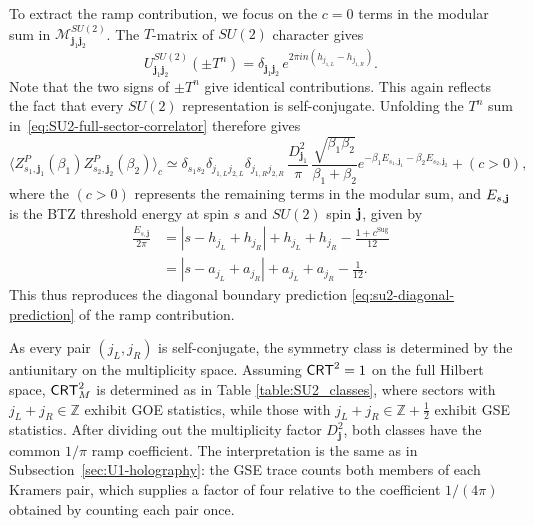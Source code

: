 \documentclass[11pt]{article}
\numberwithin{equation}{section}
\begin{document}
To extract the ramp contribution, we focus on  the  $c=0$ terms in the modular sum  in $\mathcal M^{SU(2)}_{\mathbf j_1\mathbf j_2}$. The $T$-matrix of $SU(2)$ character gives
\begin{equation}
U^{SU(2)}_{\mathbf j_1\mathbf j_2}(\pm T^n)
 =\delta_{\mathbf j_1\mathbf j_2}\,
 e^{2\pi i n(h_{j_{1,L}}-h_{j_{1,R}})}.
\end{equation}
Note that
the two signs of $\pm T^n$ give identical contributions. This again reflects the fact that   every $SU(2)$ representation is self-conjugate.
Unfolding the $T^n$ sum in~\eqref{eq:SU2-full-sector-correlator} therefore gives
\begin{equation}
 \langle Z^P_{s_1,\mathbf j_1}(\beta_1) Z^P_{s_2,\mathbf j_2}(\beta_2)\rangle_c \simeq\delta_{s_1s_2}\delta_{j_{1,L}j_{2,L}}\delta_{j_{1,R}j_{2,R}}\,
 \frac{D_{\mathbf j_1}^2}{\pi}\,
 \frac{\sqrt{\beta_1\beta_2}}{\beta_1+\beta_2}e^{-\beta_1 E_{s_1,\mathbf j_1}-\beta_2 E_{s_2,\mathbf j_2}}+(c>0),
\label{eq:SU(2)_RMT_result}
\end{equation}
where the $(c>0)$ represents the remaining terms in the modular sum, and $E_{s,\bf{j}}$ is the BTZ threshold energy  at spin $s$ and $SU(2)$ spin $\bf{j}$, given by
\begin{equation}
\begin{aligned}
 \frac{E_{s,\mathbf j}}{2\pi}
 &=|s-h_{j_L}+h_{j_R}|+h_{j_L}+h_{j_R}
   -\frac{1+c^{\mathrm{Sug}}}{12}\\
 &=|s-a_{j_L}+a_{j_R}|+a_{j_L}+a_{j_R}-\frac{1}{12}.
\end{aligned}
\label{eq:SU2-paired-threshold}
\end{equation}
This thus reproduces the diagonal boundary prediction \eqref{eq:su2-diagonal-prediction} of the ramp contribution.

As every pair $(j_L,j_R)$ is self-conjugate, the symmetry class is determined by the antiunitary on the multiplicity space. Assuming $\mathsf{CRT}^2=1$ on the full Hilbert space, $\mathsf{CRT}^2_M$ is determined as in Table \ref{table:SU2_classes}, where sectors with $j_L+j_R\in \mathbb{Z}$ exhibit GOE statistics, while those with $j_L+j_R\in \mathbb{Z}+\frac{1}{2}$ exhibit GSE statistics.  After dividing out the multiplicity factor $D_{\mathbf j}^2$, both classes have the common $1/\pi$ ramp coefficient. The
interpretation is the same as in Subsection~\ref{sec:U1-holography}: the GSE trace counts both members of each Kramers pair, which supplies a factor of four relative to the
coefficient $1/(4\pi)$ obtained by counting each pair once.
\end{document}
